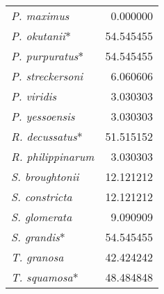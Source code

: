 \documentclass[../main.tex]{subfiles}
\begin{document}
\begin{longtable}{lr}
\textit{P. maximus}                  & 0.000000                                                                                                           \\
\textit{P. okutanii}*                & 54.545455                                                                                                          \\
\textit{P. purpuratus}*              & 54.545455                                                                                                          \\
\textit{P. streckersoni}             & 6.060606                                                                                                           \\
\textit{P. viridis}                  & 3.030303                                                                                                           \\
\textit{P. yessoensis}               & 3.030303                                                                                                           \\
\textit{R. decussatus}*              & 51.515152                                                                                                          \\
\textit{R. philippinarum}            & 3.030303                                                                                                           \\
\textit{S. broughtonii}              & 12.121212                                                                                                          \\
\textit{S. constricta}               & 12.121212                                                                                                          \\
\textit{S. glomerata}                & 9.090909                                                                                                           \\
\textit{S. grandis}*                 & 54.545455                                                                                                          \\
\textit{T. granosa}                  & 42.424242                                                                                                          \\
\textit{T. squamosa}*                & 48.484848                                 \\* \bottomrule \bottomrule                                                                        
\end{longtable}

\clearpage
\end{document}
